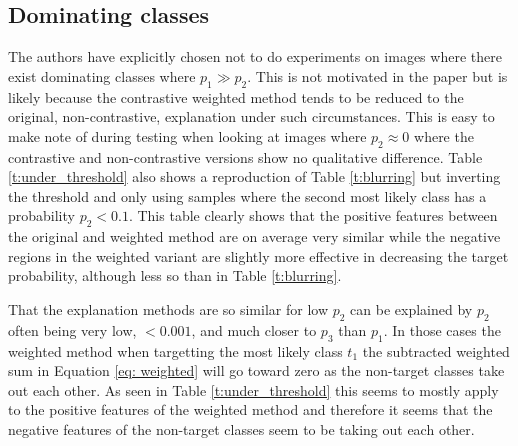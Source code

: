 \subsection{Dominating classes}
\label{dominate!!!}
The authors have explicitly chosen not to do experiments on images where there exist dominating classes where $p_1 \gg p_2$. This is not motivated in the paper but is likely because the contrastive weighted method tends to be reduced to the original, non-contrastive, explanation under such circumstances. This is easy to make note of during testing when looking at images where $p_2 \approx 0$ where the contrastive and non-contrastive versions show no qualitative difference. Table \ref{t:under_threshold} also shows a reproduction of Table \ref{t:blurring} but inverting the threshold and only using samples where the second most likely class has a probability $p_2 < 0.1$. This table clearly shows that the positive features between the original and weighted method are on average very similar while the negative regions in the weighted variant are slightly more effective in decreasing the target probability, although less so than in Table \ref{t:blurring}. 

That the explanation methods are so similar for low $p_2$ can be explained by $p_2$ often being very low, $< 0.001$, and much closer to $p_3$ than $p_1$. In those cases the weighted method when targetting the most likely class $t_1$ the subtracted weighted sum in Equation \ref{eq: weighted} will go toward zero as the non-target classes take out each other. As seen in Table \ref{t:under_threshold} this seems to mostly apply to the positive features of the weighted method and therefore it seems that the negative features of the non-target classes seem to be taking out each other.


